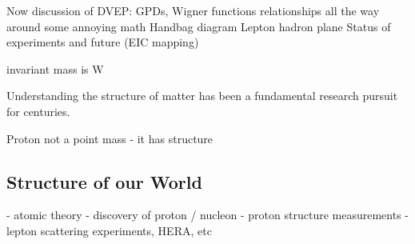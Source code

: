 Now discussion of DVEP:
GPDs, Wigner functions
relationships all the way around
some annoying math
Handbag diagram
Lepton hadron plane
Status of experiments and future (EIC mapping)







invariant mass is W 




Understanding the structure of matter has been a fundamental research pursuit for centuries. 


Proton not a point mass - it has structure



    \subsection{Structure of our World}
    - atomic theory
    - discovery of proton / nucleon
    - proton structure measurements
    - lepton scattering experiments, HERA, etc

